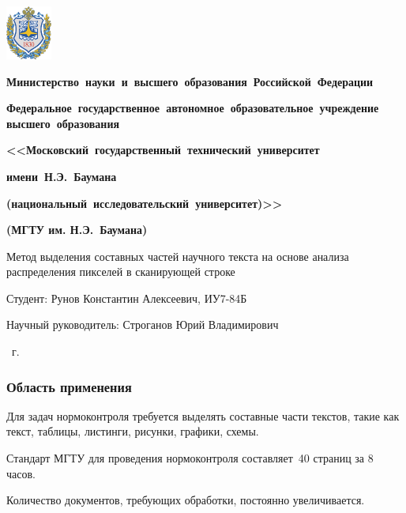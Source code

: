 \documentclass[gray]{beamer}
\begin{document}
\begingroup
{}
\begin{frame}
    \begin{minipage}{0.1\textwidth}
            \vspace{-0.1cm}
        \includegraphics[width=1.5cm]{img/bmstu.pdf}
    \end{minipage}
    \hfill
    \begin{minipage}{0.8\textwidth}\centering\bfseries
        {
            \linespread{1}\selectfont\tiny
            \vspace{0.1cm}
            \textbf{Министерство~науки~и~высшего~образования~Российской~Федерации}

            \textbf{Федеральное~государственное~автономное~образовательное~учреждение высшего~образования}

            \textbf{<<Московский~государственный~технический~университет}

            \textbf{имени~Н.Э.~Баумана}

            \textbf{(национальный~исследовательский~университет)>>}

            \vspace{-0.2cm}
            \textbf{(МГТУ им. Н.Э.~Баумана)}
            \vspace{0.1cm}
        }
    \end{minipage}

    \vfill

    \begin{center}
    \Large Метод выделения составных частей научного текста на основе анализа распределения пикселей в сканирующей строке
    \end{center}

    \vfill

    Студент: Рунов Константин Алексеевич, ИУ7-84Б

    Научный руководитель: Строганов Юрий Владимирович

    \vfill

    \begin{center}
        \the\year\ г.
    \end{center}
\end{frame}
\endgroup

\begin{frame}
    \frametitle{Область применения}

    Для задач нормоконтроля требуется выделять составные части текстов, такие как текст, таблицы, листинги, рисунки, графики, схемы.
    
    \vfill

    Стандарт МГТУ для проведения нормоконтроля составляет~40 страниц за 8 часов.

    \vfill

    Количество документов, требующих обработки, постоянно увеличивается.
\end{frame}
\end{document}
